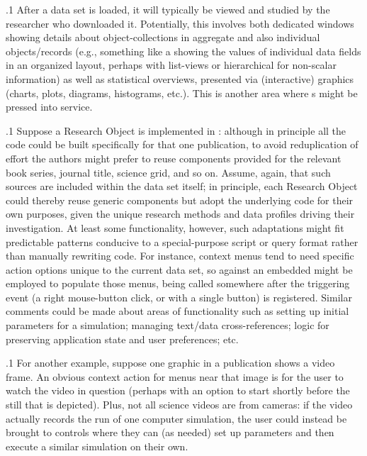 \documentclass[11pt, twocolumn]{article}
\begin{document}
\p.1{%
After a data set is loaded, it will typically be viewed and studied by the researcher
who downloaded it. Potentially, this involves both dedicated  windows
showing details about object-collections in aggregate and also individual
objects/records (e.g., something like a   showing the values
of individual data fields in an organized layout, perhaps with list-views
or hierarchical  for non-scalar information) as well as statistical
overviews, presented via (interactive) graphics (charts, plots,
diagrams, histograms, etc.). This is another area where s might be
pressed into service.
}%

\p.1{%
Suppose a Research Object is implemented in :
although in principle all the  code could be built specifically for that
one publication, to avoid reduplication of effort the authors might
prefer to reuse components provided for the relevant book series,
journal title, science grid, and so on. Assume, again, that such
 sources are included within the data set itself; in principle,
each Research Object could thereby reuse generic components but
adopt the underlying  code for their own purposes, given the
unique research methods and data profiles driving their investigation.
At least \visavis{} some functionality, however, such adaptations might
fit predictable patterns conducive to a special-purpose script or
query format rather than manually rewriting  code. For instance,
context menus tend to need specific action options unique to the
current data set, so  against an embedded  might be
employed to populate those menus, being called somewhere after
the triggering event (a right mouse-button click, or \ctrlleft{} with a single button)
is registered. Similar comments could be made about areas of
functionality such as setting up initial parameters for a
\enlargethispage{2em}simulation; managing text/data cross-references; logic for
preserving application state and user preferences; etc.
}%

\p.1{%
For another example, suppose one graphic in a publication
shows a video frame. An obvious context action
for menus near that image is for the user to watch
the video in question (perhaps with an option to
start shortly before the still that is depicted). Plus, not all
science videos are from cameras: if
the video actually records the run of
one computer simulation, the
user could instead be brought to  controls
where they can (as needed) set up parameters
and then execute a similar simulation on their own.
}%
\end{document}
